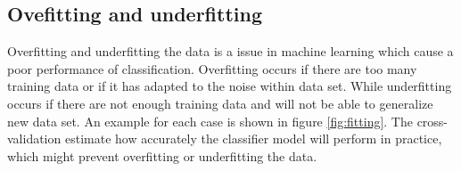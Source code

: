 \documentclass[USenglish]{ifimaster}  %
\begin{document}
	\subsection{Ovefitting and underfitting}
	Overfitting and underfitting the data is a issue in machine learning which cause a poor performance of classification. Overfitting occurs if there are too many training data or if it has adapted to the noise within data set. While underfitting occurs if there are not enough training data and will not be able to generalize new data set. An example for each case is shown in figure \ref{fig:fitting}. The cross-validation estimate how accurately the classifier model will perform in practice, which might prevent overfitting or underfitting the data.

\end{document}
